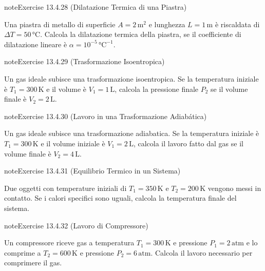 \documentclass[letterpaper,10pt,italian]{jupyterBook}
\begin{document}
\begin{sphinxadmonition}{note}{Exercise 13.4.28 (Dilatazione Termica di una Piastra)}



\sphinxAtStartPar
Una piastra di metallo di superficie \(A = 2 \, \text{m}^2\) e lunghezza \(L = 1 \, \text{m}\) è riscaldata di \(\Delta T = 50 \, \text{°C}\). Calcola la dilatazione termica della piastra, se il coefficiente di dilatazione lineare è \( \alpha = 10^{-5} \, \text{°C}^{-1}\).
\end{sphinxadmonition}
 \label{exercise:ch/thermodynamics/matter-problems-exercise-28}

\begin{sphinxadmonition}{note}{Exercise 13.4.29 (Trasformazione Isoentropica)}



\sphinxAtStartPar
Un gas ideale subisce una trasformazione isoentropica. Se la temperatura iniziale è \(T_1 = 300 \, \text{K}\) e il volume è \(V_1 = 1 \, \text{L}\), calcola la pressione finale \(P_2\) se il volume finale è \(V_2 = 2 \, \text{L}\).
\end{sphinxadmonition}
 \label{exercise:ch/thermodynamics/matter-problems-exercise-29}

\begin{sphinxadmonition}{note}{Exercise 13.4.30 (Lavoro in una Trasformazione Adiabática)}



\sphinxAtStartPar
Un gas ideale subisce una trasformazione adiabatica. Se la temperatura iniziale è \(T_1 = 300 \, \text{K}\) e il volume iniziale è \(V_1 = 2 \, \text{L}\), calcola il lavoro fatto dal gas se il volume finale è \(V_2 = 4 \, \text{L}\).
\end{sphinxadmonition}
 \label{exercise:ch/thermodynamics/matter-problems-exercise-30}

\begin{sphinxadmonition}{note}{Exercise 13.4.31 (Equilibrio Termico in un Sistema)}



\sphinxAtStartPar
Due oggetti con temperature iniziali di \(T_1 = 350 \, \text{K}\) e \(T_2 = 200 \, \text{K}\) vengono messi in contatto. Se i calori specifici sono uguali, calcola la temperatura finale del sistema.
\end{sphinxadmonition}
 \label{exercise:ch/thermodynamics/matter-problems-exercise-31}

\begin{sphinxadmonition}{note}{Exercise 13.4.32 (Lavoro di Compressore)}



\sphinxAtStartPar
Un compressore riceve gas a temperatura \(T_1 = 300 \, \text{K}\) e pressione \(P_1 = 2 \, \text{atm}\) e lo comprime a \(T_2 = 600 \, \text{K}\) e pressione \(P_2 = 6 \, \text{atm}\). Calcola il lavoro necessario per comprimere il gas.
\end{sphinxadmonition}
\end{document}
